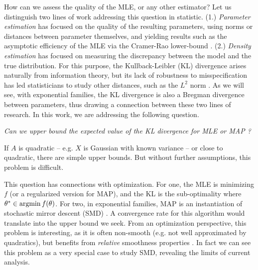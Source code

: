 \documentclass[twoside]{article}
\newcommand{\cond}{\,\vert\,}
\newcommand{\logpart}{A}
\newcommand{\nat}{\theta}
\begin{document}
How can we assess the quality of the MLE, or any other estimator?
Let us distinguish two lines of work addressing this question in statistic.
(1.) \emph{Parameter estimation} has focused on the quality of the resulting parameters, using norms or distances between parameter themselves, and yielding results such as the asymptotic efficiency of the MLE via the Cramer-Rao lower-bound \citep{aitken1942estimation}.
(2.) \emph{Density estimation} has focused on measuring the discrepancy between the model and the true distribution.
For this purpose, the Kullback-Leibler (KL) divergence arises naturally from information theory,
but its lack of robustness to misspecification has led statisticians to study other distances, such as the $L^2$ norm \citep[\S1.2]{tsybakov2009introduction}.
As we will see, with exponential families, the KL divergence is also a Bregman divergence between parameters, thus drawing a connection between these two lines of research. 
In this work, we are addressing the following question.

\emph{Can we upper bound  the expected value of the KL divergence for MLE or MAP ?}

If $\logpart$ is quadratic -- e.g. $X$ is Gaussian with known variance --
or close to quadratic, there are simple upper bounds. 
But without further assumptions, this problem is difficult.

This question has connections with optimization.
For one, the MLE is minimizing $f$ (or a regularized version for MAP), and the KL is the sub-optimality
\alignn{
f(\nat) - f(\nat^*) = \KL\paren{p(\cdot \cond \nat^*) || p(\cdot \cond \nat) }
\label{eq:suboptimalityKL}
}
where $\nat^* \in \argmin f(\nat)$.
For two, in exponential families, MAP is an instantiation of stochastic mirror descent (SMD) \citep{nemirovski2009robust}.
A convergence rate for this algorithm would translate into the upper bound we seek.
From an optimization perspective, this problem is interesting, as it is often non-smooth (e.g. not well approximated by quadratics), but benefits from \emph{relative} smoothness properties \citep{birnbaum2011distributed}.
In fact we can see this problem as a very special case to study SMD, revealing the limits of current analysis.
\end{document}
